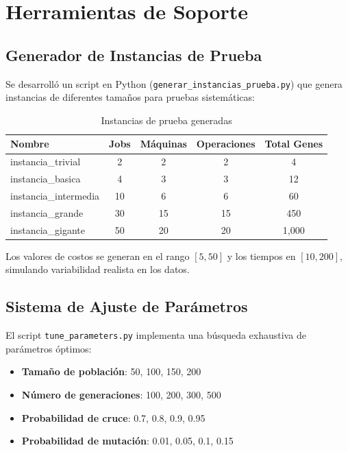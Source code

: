 \documentclass[preprint,12pt,authoryear]{elsarticle}
\begin{document}
\section{Herramientas de Soporte}

\subsection{Generador de Instancias de Prueba}

Se desarrolló un script en Python (\texttt{generar\_instancias\_prueba.py}) que genera instancias de diferentes tamaños para pruebas sistemáticas:

\begin{table}[h]
\centering
\caption{Instancias de prueba generadas}
\begin{tabular}{|l|c|c|c|c|}
\hline
\textbf{Nombre} & \textbf{Jobs} & \textbf{Máquinas} & \textbf{Operaciones} & \textbf{Total Genes} \\
\hline
instancia\_trivial & 2 & 2 & 2 & 4 \\
instancia\_basica & 4 & 3 & 3 & 12 \\
instancia\_intermedia & 10 & 6 & 6 & 60 \\
instancia\_grande & 30 & 15 & 15 & 450 \\
instancia\_gigante & 50 & 20 & 20 & 1,000 \\
\hline
\end{tabular}
\end{table}

Los valores de costos se generan en el rango $[5, 50]$ y los tiempos en $[10, 200]$, simulando variabilidad realista en los datos.

\subsection{Sistema de Ajuste de Parámetros}

El script \texttt{tune\_parameters.py} implementa una búsqueda exhaustiva de parámetros óptimos:

\begin{itemize}
    \item \textbf{Tamaño de población}: 50, 100, 150, 200
    \item \textbf{Número de generaciones}: 100, 200, 300, 500
    \item \textbf{Probabilidad de cruce}: 0.7, 0.8, 0.9, 0.95
    \item \textbf{Probabilidad de mutación}: 0.01, 0.05, 0.1, 0.15
\end{itemize}
\end{document}
